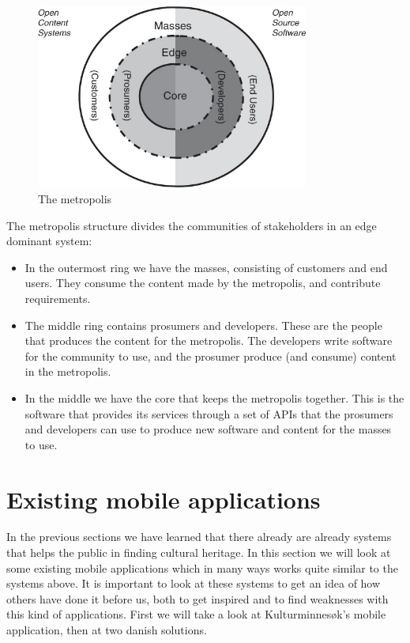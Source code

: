 \documentclass[11pt]{book}
\begin{document}
\begin{figure}[H]
      \centering
      \includegraphics[width=0.8\textwidth]{Figures/Prestudy/metropolis.jpg}
      \caption{The metropolis}
      \label{fig:pre_edgeMetropolis}
\end{figure}

The metropolis structure divides the communities of stakeholders in an edge dominant system:

\begin{itemize}
  \item In the outermost ring we have the masses, consisting of customers and end users. They consume the content made by the metropolis, and contribute requirements.
  \item The middle ring contains prosumers and developers. These are the people that produces the content for the metropolis. The developers write software for the community to use, and the prosumer produce (and consume) content in the metropolis.
  \item In the middle we have the core that keeps the metropolis together. This is the software that provides its services through a set of APIs that the prosumers and developers can use to produce new software and content for the masses to use.
\end{itemize}

\section{Existing mobile applications}\label{sec:prestudy_existing_apps}
In the previous sections we have learned that there already are already systems that helps the public in finding cultural heritage. In this section we will look at some existing mobile applications which in many ways works quite similar to the systems above. It is important to look at these systems to get an idea of how others have done it before us, both to get inspired and to find weaknesses with this kind of applications. First we will take a look at Kulturminnesøk's mobile application, then at two danish solutions.
\end{document}
